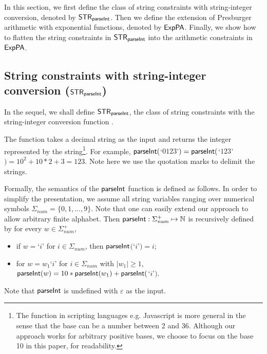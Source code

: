
In this section, we first define the class of string constraints with string-integer conversion, denoted by ${\sf STR}_{\textsf{parseInt}}$. Then we define the extension of Presburger arithmetic with exponential functions, denoted by ${\sf ExpPA}$. Finally, we show how to flatten the string constraints in ${\sf STR}_{\textsf{parseInt}}$ into the arithmetic constraints in ${\sf ExpPA}$.

\vspace*{-3mm}
\subsection{String constraints with string-integer conversion (${\sf STR}_{\textsf{parseInt}}$)}

In the sequel, we shall define ${\sf STR}_{\textsf{parseInt}}$, the class of string constraints with the string-integer conversion function {\parseInt}.

The function  {\parseInt} takes a decimal string as the input and returns the integer represented by the string\footnote{The {\parseInt} function in scripting languages e.g. Javascript is more general in the sense that the base can be a number between 2 and 36. Although our approach works for arbitrary positive bases, we choose to focus on the base 10 in this paper, for readability.}.
For example,
${\textsf{parseInt}}($`$0123$'$) = {\textsf{parseInt}}($`$123$'$)=10^2+10*2+3 = 123$. 
Note here we use the quotation marks to delimit the strings.

Formally, the semantics of the $\textsf{parseInt}$ function is defined as follows. 
In order to simplify the presentation, we assume all string variables ranging over numerical symbols $\Sigma_{\textit{num}}=\{0,1, \ldots, 9\}$. Note that one can easily extend our approach to allow arbitrary finite alphabet. Then ${\textsf{parseInt}}: \Sigma_{\textit{num}}^+ \mapsto \mathbb{N}$ is recursively defined by
    for every $w\in \Sigma_{\textit{num}}^+$,
    \begin{itemize}
        \item  if $w=$`$i$' for $i \in \Sigma_{\textit{num}}$, then ${\textsf{parseInt}}$$($`$i$'$)=i$;
        \item for $w = w_1$`$i$' for $i \in \Sigma_{\textit{num}}$ with $|w_1| \ge 1$, 
        ${\textsf{parseInt}}(w) = 10*{\textsf{parseInt}}(w_1)+{\textsf{parseInt}}($`$i$'$)$.
    \end{itemize} 
Note that $\textsf{parseInt}$ is undefined with $\varepsilon$ as the input.



